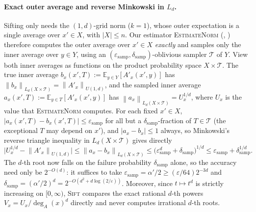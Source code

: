 \documentclass[11pt]{article}
\theoremstyle{definition}
\newcommand{\E}{\mathbb{E}}
\newcommand{\norm}[1]{\left\lVert #1 \right\rVert}
\newcommand{\abs}[1]{\left\lvert #1 \right\rvert}
\newcommand{\EstimateNorm}{\textnormal{\textsc{EstimateNorm}}}
\newcommand{\Sift}{\textnormal{\textsc{Sift}}}
\begin{document}
\paragraph{Exact outer average and reverse Minkowski in $L_d$.}
Sifting only needs the $(1, d)$-grid norm ($k = 1$), whose outer expectation is a single average over $x' \in X$, with $\abs{X} \le n$. Our estimator \EstimateNorm{} (, ) therefore computes the outer average over $x' \in X$ \emph{exactly} and samples only the inner average over $y \in Y$, using an $(\varepsilon_{\text{samp}}, \delta_{\text{samp}})$-oblivious sampler $\mathcal{T}$ of $Y$. View both inner averages as functions on the product probability space $X \times \mathcal{T}$. The true inner average $b_x(x', T) := \E_{y \in Y}[A'_x(x', y)]$ has $\norm{b_x}_{L_d(X \times \mathcal{T})} = \norm{A'_x}_{U(1, d)}$, and the sampled inner average $a_x(x', T) := \E_{y \in T}[A'_x(x', y)]$ has $\norm{a_x}_{L_d(X \times \mathcal{T})} = U_x^{1/d}$, where $U_x$ is the value that \EstimateNorm{} computes. For each fixed $x' \in X$, $\abs{a_x(x', T) - b_x(x', T)} \le \varepsilon_{\text{samp}}$ for all but a $\delta_{\text{samp}}$-fraction of $T \in \mathcal{T}$ (the exceptional $T$ may depend on $x'$), and $\abs{a_x - b_x} \le 1$ always, so Minkowski's reverse triangle inequality in $L_d(X \times \mathcal{T})$ gives directly
\[
    \Big|U_x^{1/d} - \norm{A'_x}_{U(1, d)}\Big| \le \norm{a_x - b_x}_{L_d(X \times \mathcal{T})} \le \big(\varepsilon_{\text{samp}}^d + \delta_{\text{samp}}\big)^{1/d} \le \varepsilon_{\text{samp}} + \delta_{\text{samp}}^{1/d}.
\]
The $d$-th root now falls on the failure probability $\delta_{\text{samp}}$ alone, so the accuracy need only be $2^{-O(d)}$: it suffices to take $\varepsilon_{\text{samp}} = \alpha'/2 \ge (\varepsilon/64)2^{-3d}$ and $\delta_{\text{samp}} = (\alpha'/2)^d = 2^{-O(d^2 + d\log(2/\varepsilon))}$. Moreover, since $t \mapsto t^d$ is strictly increasing on $[0, \infty)$, \Sift{} compares the exact rational $d$-th powers $V_x = U_x / \deg_A(x)^d$ directly and never computes irrational $d$-th roots.
\end{document}
